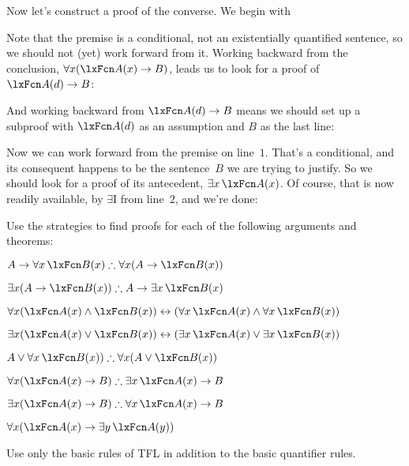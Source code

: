 Now let's construct a proof of the converse. We begin with
\begin{fitchproof}
	\PR
	\ellipsesline
\end{fitchproof}
Note that the premise is a conditional, not an existentially quantified sentence, so we should not (yet) work forward from it. Working backward from the conclusion, $\forall x(\atom{A}{x} \eif B)$, leads us to look for a proof of $\atom{A}{d} \eif B$:
\begin{fitchproof}
	\PR
	\ellipsesline
\end{fitchproof}
And working backward from $\atom{A}{d} \eif B$ means we should set up a subproof with $\atom{A}{d}$ as an assumption and $B$ as the last line:
\begin{fitchproof}
	\PR
	\open
	\AS
	\ellipsesline
	\close
\end{fitchproof}
Now we can work forward from the premise on line~$1$. That's a conditional, and its consequent happens to be the sentence~$B$ we are trying to justify. So we should look for a proof of its antecedent, $\exists x\,\atom{A}{x}$. Of course, that is now readily available, by $\exists$I from line~$2$, and we're done:
\begin{fitchproof}
	\PR
	\open
	\AS
	\close
\end{fitchproof}

\practiceproblems

\problempart
Use the strategies to find proofs for each of the following arguments and theorems:
\begin{compactlist}
\item $A \eif \forall x\,\atom{B}{x} \therefore \forall x(A \eif \atom{B}{x})$
\item $\exists x(A \eif \atom{B}{x}) \therefore A \eif \exists x\, \atom{B}{x}$
\item $\forall x(\atom{A}{x} \eand \atom{B}{x}) \eiff (\forall x\,\atom{A}{x} \eand \forall x\,\atom{B}{x})$
\item $\exists x(\atom{A}{x} \eor \atom{B}{x}) \eiff (\exists x\,\atom{A}{x} \eor \exists x\,\atom{B}{x})$
\item $A \eor \forall x\,\atom{B}{x}) \therefore \forall x(A \eor \atom{B}{x})$
\item $\forall x(\atom{A}{x} \eif B) \therefore \exists x\,\atom{A}{x} \eif B$
\item $\exists x(\atom{A}{x} \eif B) \therefore \forall x\,\atom{A}{x} \eif B$
\item $\forall x(\atom{A}{x} \eif \exists y\,\atom{A}{y})$
\end{compactlist}
Use only the basic rules of TFL in addition to the basic quantifier rules.

